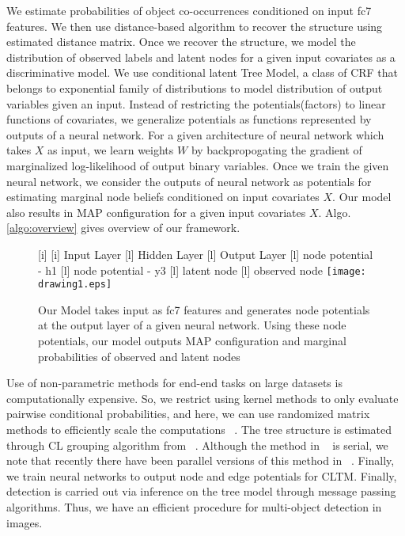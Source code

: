 \documentclass{article}
\begin{document}
We estimate probabilities of object co-occurrences conditioned on input fc7 features. We then use distance-based algorithm to recover the structure using estimated distance matrix.  Once we recover the structure, we model the distribution of observed labels and latent nodes for a given input covariates as a discriminative model. We use conditional latent Tree Model, a class of CRF that belongs to exponential family of distributions to model distribution of output variables given an input. Instead of restricting the potentials(factors) to linear functions of covariates, we generalize potentials as functions represented by outputs of a neural network. For a given architecture of neural network which takes $X$ as input, we learn weights $W$ by  backpropogating the gradient of marginalized log-likelihood of output binary variables. Once we train the given neural network, we consider the outputs of neural network as  potentials for estimating marginal node beliefs conditioned on input covariates $X$. Our model also results in MAP configuration for a given input covariates $X$. Algo.\ref{algo:overview} gives overview of our framework.

\begin{figure}
\begin{center}
[i]{}
[i]{ \tiny{Input Layer}}
[l]{ \tiny{Hidden Layer}}
[l]{ \tiny{Output Layer}}
[l]{ \tiny{node potential - h1}}
[l]{ \tiny{node potential - y3}}
[l]{ \tiny{latent node}}
[l]{ \tiny{observed node}}
\texttt{[image: drawing1.eps]}
\end{center}
\vspace{-0.15in}

\caption{ Our Model takes input as fc7 features and generates node potentials at the output layer of a given neural network. Using these node potentials, our model outputs MAP configuration and marginal probabilities of observed and latent nodes}
\label{neuralnet}
\end{figure}

Use of non-parametric methods for end-end tasks on large datasets is computationally expensive. So, we restrict using kernel methods to only evaluate  pairwise conditional probabilities, and here, we can use randomized matrix methods to efficiently scale the computations ~\cite{nystorm}. The tree structure is estimated through CL grouping algorithm from ~\cite{LTM}. Although the method in ~\cite{LTM} is serial, we note that recently there have been parallel versions of this method in ~\cite{scalableLTM}.  Finally, we train neural networks to output node and edge potentials for CLTM. Finally, detection is carried out via inference on the tree model through message passing algorithms. Thus, we have an efficient procedure for multi-object detection in images.
\end{document}
